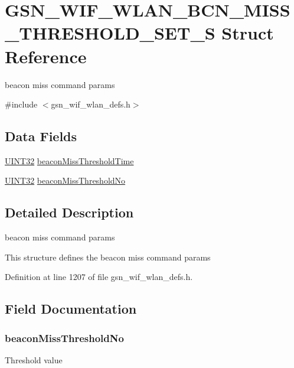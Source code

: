 \hypertarget{a00372}{
\section{GSN\_\-WIF\_\-WLAN\_\-BCN\_\-MISS\_\-THRESHOLD\_\-SET\_\-S Struct Reference}
\label{a00372}
}


beacon miss command params  




{\ttfamily \#include $<$gsn\_\-wif\_\-wlan\_\-defs.h$>$}

\subsection*{Data Fields}
\begin{DoxyCompactItemize}
\item 
\hyperlink{a00660_gae1e6edbbc26d6fbc71a90190d0266018}{UINT32} \hyperlink{a00372_af109723ccdee8fd64b8f17699c9af723}{beaconMissThresholdTime}
\item 
\hyperlink{a00660_gae1e6edbbc26d6fbc71a90190d0266018}{UINT32} \hyperlink{a00372_a879a9f06fd8a17d39ee77e6f06b4a8ce}{beaconMissThresholdNo}
\end{DoxyCompactItemize}


\subsection{Detailed Description}
beacon miss command params 

This structure defines the beacon miss command params 

Definition at line 1207 of file gsn\_\-wif\_\-wlan\_\-defs.h.



\subsection{Field Documentation}
\hypertarget{a00372_a879a9f06fd8a17d39ee77e6f06b4a8ce}{
\subsubsection[{beaconMissThresholdNo}]{ {\bf beaconMissThresholdNo}}}
\label{a00372_a879a9f06fd8a17d39ee77e6f06b4a8ce}
Threshold value 

